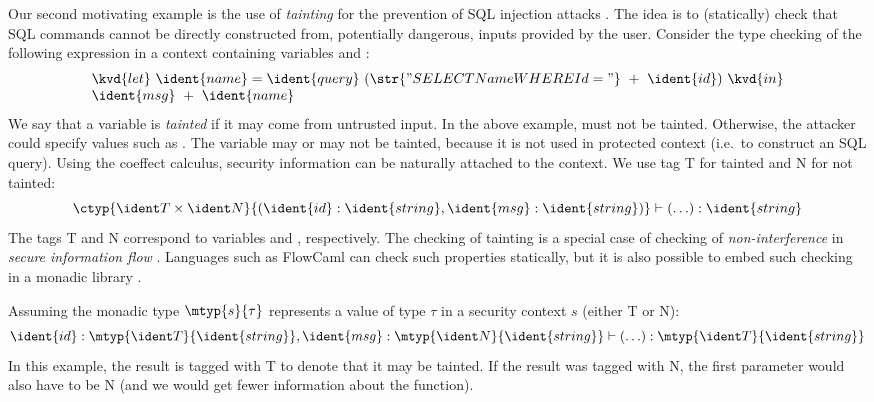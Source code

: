 Our second motivating example is the use of \emph{tainting} for the prevention of SQL injection 
attacks \cite{app-secure-tainting}. The idea is to (statically) check that SQL commands cannot be 
directly constructed from, potentially dangerous, inputs provided by the user. Consider the type
checking of the following expression in a context containing variables  and :
%
\begin{equation*}
\begin{array}{l}
\kvd{let}~\ident{name} = \ident{query}~(\str{"SELECT Name WHERE Id = "}~+~\ident{id})~\kvd{in}\\
\ident{msg}~+~\ident{name}
\end{array}
\end{equation*}
%
We say that a variable is \emph{tainted} if it may come from untrusted input. In the above example,
 must not be tainted. Otherwise, the attacker could specify values such as 
. The variable  may or may not be tainted, because it is not
used in protected context (i.e.~to construct an SQL query). Using the coeffect calculus, security
information can be naturally attached to the context. We use tag \ident T for tainted and 
\ident N for not tainted:
%
\begin{equation*}
\ctyp{\ident T \times \ident N}{(\ident{id}:\ident{string}, \ident{msg}:\ident{string})} 
  \vdash (\ldots) : \ident{string}
\end{equation*}
%
The tags \ident T and \ident N correspond to variables  and , respectively.
The checking of tainting is a special case of checking of \emph{non-interference} in 
\emph{secure information flow} \cite{app-secure-information-flow}. Languages such as FlowCaml 
\cite{app-security-flowcaml} can check such properties statically, but it is also possible to 
embed such checking in a monadic library \cite{monad-secure-flow}.
 
Assuming the monadic type $\mtyp{s}{\tau}$ represents a value of type $\tau$ 
in a security context $s$ (either \ident T or \ident N): 
%
\begin{equation*}
\ident{id} : \mtyp{\ident T}{\ident{string}}, \ident{msg} : \mtyp{\ident N}{\ident{string}} 
  \vdash (\ldots) : \mtyp{\ident T}{\ident{string}}
\end{equation*}
%
In this example, the result is tagged with \ident T to denote that it may be tainted.
If the result was tagged with \ident N, the first parameter would also have to be \ident N
(and we would get fewer information about the function).

